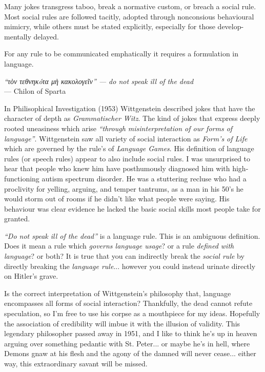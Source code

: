 Many jokes transgress taboo, break a normative custom, or breach a social rule. 
Most social rules are followed tacitly, adopted through nonconsious behavioural mimicry, 
while others must be stated explicitly, especially for those develop-mentally delayed.

\noindent
For any rule to be communicated emphatically it requires a formulation in language.

\begin{center}
\textit{``\textgreek{τὸν τεθνηκóτα μὴ κακολογεῖν}'' --- do not speak ill of the dead}
\\ --- Chilon of Sparta 
\end{center}

In Philisophical Investigation (1953) Wittgenstein described jokes that have the character of depth as \textit{Grammatischer Witz}. The kind of jokes that express deeply rooted uneasiness which arise \textit{``through misinterpretation of our forms of language''}. Wittgenstein saw all variety of social interaction as \textit{Form's of Life} which are governed by the rule's of \textit{Language Games}. His definition of language rules (or speech rules) appear to also include social rules. I was unsurprised to hear that people who knew him have posthumously diagnosed him with high-functioning autism spectrum disorder. He was a stuttering recluse who had a proclivity for yelling, arguing, and temper tantrums, as a man in his 50's he would storm out of rooms if he didn't like what people were saying. His behaviour was clear evidence he lacked the basic social skills most people take for granted. 

\textit{``Do not speak ill of the dead''} is a language rule. This is an ambiguous definition. Does it mean a rule which \textit{governs language usage}? or a rule \textit{defined with language}? or both? It is true that you can indirectly break the \textit{social rule} by directly breaking the \textit{language rule}... however you could instead urinate directly on Hitler's grave.

Is the correct interpretation of Wittgenstein's philosophy that, language encompasses all forms of social interaction? Thankfully, the dead cannot refute speculation, so I'm free to use his corpse as a mouthpiece for my ideas. Hopefully the association of credibility will imbue it with the illusion of validity. This legendary philosopher passed away in 1951, and I like to think he's up in heaven arguing over something pedantic with St. Peter... or maybe he's in hell, where Demons gnaw at his flesh and the agony of the damned will never cease... either way, this extraordinary savant will be missed.

